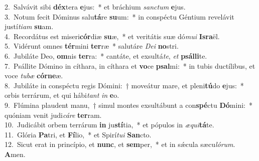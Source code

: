 {2.~}Salvávit sibi \textbf{déx}tera \textbf{e}jus:~* et bráchium \textit{san}\textit{ctum} \textbf{e}jus.\\
{3.~}Notum fecit Dóminus salu\textbf{tá}re \textbf{su}um:~* in conspéctu Géntium revelávit justí\textit{ti}\textit{am} \textbf{su}am.\\
{4.~}Recordátus est miseri\textbf{cór}diæ \textbf{su}æ,~* et veritátis suæ dó\textit{mu}\textit{i} \textbf{Is}\textbf{ra}ël.\\
{5.~}Vidérunt omnes \textbf{tér}mini \textbf{ter}ræ~* salutáre \textit{De}\textit{i} \textbf{no}stri.\\
{6.~}Jubiláte Deo, \textbf{om}nis \textbf{ter}ra:~* cantáte, et exsultá\textit{te}, \textit{et} \textbf{psál}\textbf{li}te.\\
{7.~}Psállite Dómino in cíthara, in cíthara et \textbf{vo}ce \textbf{psal}mi:~* in tubis ductílibus, et voce \textit{tu}\textit{bæ} \textbf{cór}\textbf{ne}æ.\\
{8.~}Jubiláte in conspéctu regis Dómini:~† moveátur mare, et pleni\textbf{tú}do \textbf{e}jus:~* orbis terrárum, et qui hábi\textit{tant} \textit{in} \textbf{e}o.\\
{9.~}Flúmina plaudent manu,~† simul montes exsultábunt a con\textbf{spé}ctu \textbf{Dó}mini:~* quóniam venit judi\textit{cá}\textit{re} \textbf{ter}ram.\\
{10.~}Judicábit orbem terrárum \textbf{in} ju\textbf{stí}tia,~* et pópulos in \textit{æ}\textit{qui}\textbf{tá}te.\\
{11.~}Glória \textbf{Pa}tri, et \textbf{Fí}lio,~* et Spirí\textit{tu}\textit{i} \textbf{San}cto.\\
{12.~}Sicut erat in princípio, et \textbf{nunc}, et \textbf{sem}per,~* et in sǽcula sæcu\textit{ló}\textit{rum}. \textbf{A}men.\\
